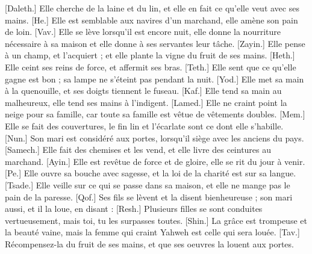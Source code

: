 \begin{multicols}{2}
[Daleth.] Elle cherche de la laine et du lin, et elle en fait ce qu'elle veut avec ses mains.
[He.] Elle est semblable aux navires d'un marchand, elle amène son pain de loin.
[Vav.] Elle se lève lorsqu'il est encore nuit, elle donne la nourriture nécessaire à sa maison et elle donne à ses servantes leur tâche.
[Zayin.] Elle pense à un champ, et l'acquiert ; et elle plante la vigne du fruit de ses mains.
[Heth.] Elle ceint ses reins de force, et affermit ses bras.
[Teth.] Elle sent que ce qu’elle gagne est bon ; sa lampe ne s'éteint pas pendant la nuit.
[Yod.] Elle met sa main à la quenouille, et ses doigts tiennent le fuseau.
[Kaf.] Elle tend sa main au malheureux, elle tend ses mains à l’indigent.
[Lamed.] Elle ne craint point la neige pour sa famille, car toute sa famille est vêtue de vêtements doubles.
[Mem.] Elle se fait des couvertures, le fin lin et l'écarlate sont ce dont elle s'habille.
[Nun.] Son mari est considéré aux portes, lorsqu’il siège avec les anciens du pays.
[Samech.] Elle fait des chemises et les vend, et elle livre des ceintures au marchand.
[Ayin.] Elle est revêtue de force et de gloire, elle se rit du jour à venir.
[Pe.] Elle ouvre sa bouche avec sagesse, et la loi de la charité est sur sa langue.
[Tsade.] Elle veille sur ce qui se passe dans sa maison, et elle ne mange pas le pain de la paresse.
[Qof.] Ses fils se lèvent et la disent bienheureuse ; son mari aussi, et il la loue, en disant :
[Resh.] Plusieurs filles se sont conduites vertueusement, mais toi, tu les surpasses toutes.
[Shin.] La grâce est trompeuse et la beauté vaine, mais la femme qui craint Yahweh est celle qui sera louée.
[Tav.] Récompensez-la du fruit de ses mains, et que ses oeuvres la louent aux portes.
\PPE{}
\end{multicols}
